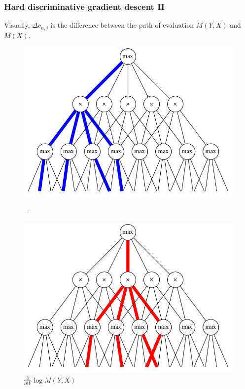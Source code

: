 \documentclass{beamer}
\newcommand{\ddspn}[2]{\frac{\partial#1}{\partial#2}}
\begin{document}
\begin{frame}
  \frametitle{Hard discriminative gradient descent II}

  Visually, $\Delta c_{n,j}$ is the difference between the path of evaluation $M(Y, X)$ and $M(X)$.

  \begin{figure}[h]
    \centering
    \begin{minipage}{0.3\textwidth}
      \includegraphics[width=\linewidth]{imgs/hard_diff_0.png}
      \captionsetup{justification=centering}
      \caption*{$\ddspn{}{W}\log M(Y,X)$}
    \end{minipage}
    $-$
    \begin{minipage}{0.3\textwidth}
      \includegraphics[width=\linewidth]{imgs/hard_diff_1.png}
      \captionsetup{justification=centering}

\end{minipage}
\end{figure}
\end{frame}
\end{document}
